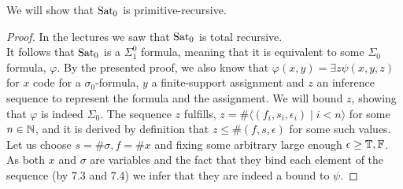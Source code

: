 \question[3]
We will show that $\operatorname{Sat}_0$ is primitive-recursive.
\begin{proof}
	In the lectures we saw that $\operatorname{Sat}_0$ is total recursive. \\
	It follows that $\operatorname{Sat}_0$ is a $\Sigma_1^0$ formula, meaning that it is equivalent to some $\Sigma_0$ formula, $\varphi$.
	By the presented proof, we also know that $\varphi(x, y) = \exists z \psi(x, y, z)$ for $x$ code for a $\sigma_0$-formula,
	$y$ a finite-support assignment and $z$ an inference sequence to represent the formula and the assignment.
	We will bound $z$, showing that $\varphi$ is indeed $\Sigma_0$.
	The sequence $z$ fulfills, $z = \# \langle (f_i, s_i, \epsilon_i) \mid i < n \rangle$ for some $n \in \mathbb{N}$, and it is derived by definition that $z \le \# (f, s, \epsilon)$ for some such values.
	Let us choose $s = \# \sigma, f = \# x$ and fixing some arbitrary large enough $\epsilon \ge \mathbb{T}, \mathbb{F}$.
	As both $x$ and $\sigma$ are variables and the fact that they bind each element of the sequence (by 7.3 and 7.4) we infer that they are indeed a bound to $\psi$.
\end{proof}

